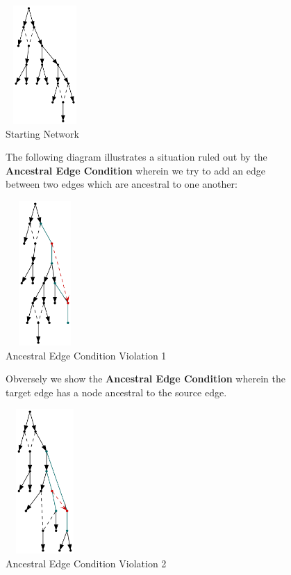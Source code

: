 \documentclass[11pt]{article}
\begin{document}
\begin{figure}
  \begin{center}
  \includegraphics[width=30mm, height=45mm]{base-network.png}
  \caption{Starting Network}
  \label{fig:base-network}
  \end{center}
\end{figure}



\begin{figure}
\noindent The following diagram illustrates a situation ruled out by the \textbf{Ancestral Edge Condition} wherein we try to add an edge between two edges which are ancestral to one another:
\vspace{2mm}
  \begin{center}
  \includegraphics[width=30mm, height=55mm]{e2AncestralEdgeNetwork.png}
  \caption{Ancestral Edge Condition Violation 1}
  \label{fig:e2AncestralEdgeNetwork}
  \end{center}
\end{figure}

\FloatBarrier


\begin{figure}
\noindent Obversely we show the \textbf{Ancestral Edge Condition} wherein the target edge has a node ancestral to the source edge.
\vspace{2mm}
  \begin{center}
  \includegraphics[width=30mm, height=55mm]{e1HasE2SrcDescendantNodeNetwork.png}
  \caption{Ancestral Edge Condition Violation 2}
  \label{fig:e1HasE2SrcDescendantNodeNetwork.png}
  \end{center}
\end{figure}
\end{document}
